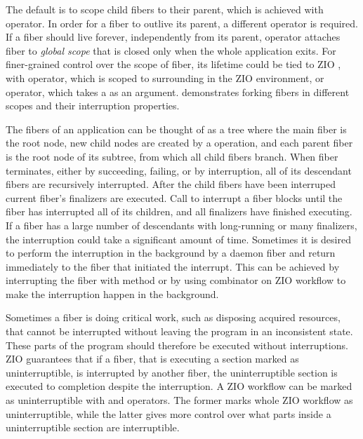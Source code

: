 

The default is to scope child fibers to their parent, which is achieved with  operator. In order for a fiber to outlive its parent, a different operator is required. If a fiber should live forever, independently from its parent,  operator attaches fiber to \textit{global scope} that is closed only when the whole application exits. For finer-grained control over the scope of fiber, its lifetime could be tied to ZIO , with  operator, which is scoped to surrounding  in the ZIO environment, or  operator, which takes a  as an argument.  demonstrates forking fibers in different scopes and their interruption properties.



The fibers of an application can be thought of as a tree where the main fiber is the root node, new child nodes are created by a  operation, and each parent fiber is the root node of its subtree, from which all child fibers branch. When fiber terminates, either by succeeding, failing, or by interruption, all of its descendant fibers are recursively interrupted. After the child fibers have been interruped current fiber's finalizers are executed. Call to interrupt a fiber blocks until the fiber has interrupted all of its children, and all finalizers have finished executing. If a fiber has a large number of descendants with long-running or many finalizers, the interruption could take a significant amount of time. Sometimes it is desired to perform the interruption in the background by a daemon fiber and return immediately to the fiber that initiated the interrupt. This can be achieved by interrupting the fiber with  method or by using  combinator on ZIO workflow to make the interruption happen in the background.

Sometimes a fiber is doing critical work, such as disposing acquired resources, that cannot be interrupted without leaving the program in an inconsistent state. These parts of the program should therefore be executed without interruptions. ZIO guarantees that if a fiber, that is executing a section marked as uninterruptible, is interrupted by another fiber, the uninterruptible section is executed to completion despite the interruption. A ZIO workflow can be marked as uninterruptible with  and  operators. The former marks whole ZIO workflow as uninterruptible, while the latter gives more control over what parts inside a uninterruptible section are interruptible.

